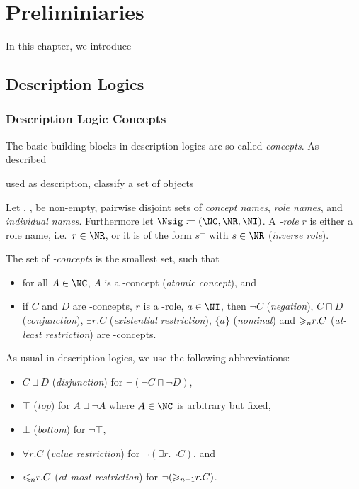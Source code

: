 
\chapter{Preliminiaries}
\label{cha:preliminiaries}

In this chapter, we introduce 



\section{Description Logics}
\label{sec:description-logics}


\subsection{Description Logic Concepts}
\label{sec:dl-concepts}


The basic building blocks in description logics are so-called \emph{concepts}. As described

used as description, classify a set of objects


\begin{definition}
  \label{def:syntax-concepts}
  Let \NC, \NR, \NI be non-empty, pairwise disjoint sets of \emph{concept names}, \emph{role names},
  and \emph{individual names}. Furthermore let $\Nsig\coloneqq(\NC,\NR,\NI)$. A \emph{\Nsig-role} $r$ is
  either a role name, i.e.~$r\in\NR$, or it is of the form $s^{-}$ with $s\in\NR$ (\emph{inverse role}).

  The set of \emph{\Nsig-concepts} is the smallest set, such that
  \begin{itemize}
  \item for all $A\in\NC$, $A$ is a \Nsig-concept (\emph{atomic concept}), and
  \item if $C$ and $D$ are \Nsig-concepts, $r$ is a \Nsig-role, $a\in\NI$, then $\lnot C$ (\emph{negation}),
    $C\sqcap D$ (\emph{conjunction}), $\exists r.C$ (\emph{existential restriction}), $\{a\}$
    (\emph{nominal}) and ${\geqslant_{n}}r.C$ (\emph{at-least restriction}) are \Nsig-concepts. \qedhere
  \end{itemize}
\end{definition}

As usual in description logics, we use the following abbreviations:
\begin{itemize}
\item $C\sqcup D$ (\emph{disjunction}) for $\lnot(\lnot C \sqcap \lnot D)$,
\item $\top$ (\emph{top}) for $A \sqcup \lnot A$ where $A\in\NC$ is arbitrary but fixed,
\item $\bot$ (\emph{bottom}) for $\lnot\top$,
\item $\forall r.C$ (\emph{value restriction}) for $\lnot(\exists r.\lnot C)$, and
\item ${\leqslant_{n}}r.C$ (\emph{at-most restriction}) for $\lnot({\geqslant_{n+1}}r.C)$.
\end{itemize}


